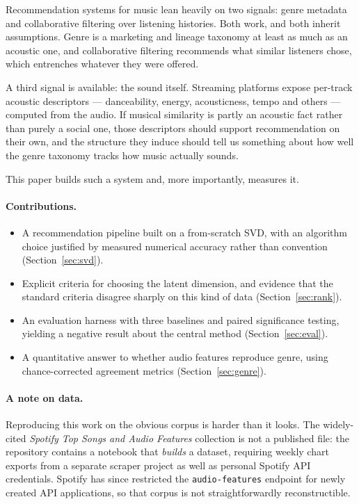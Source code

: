 \documentclass[11pt]{article}
\newcommand{\code}[1]{\texttt{\small #1}}
\begin{document}
Recommendation systems for music lean heavily on two signals: genre metadata
and collaborative filtering over listening histories. Both work, and both
inherit assumptions. Genre is a marketing and lineage taxonomy at least as much
as an acoustic one, and collaborative filtering recommends what similar
listeners chose, which entrenches whatever they were offered.

A third signal is available: the sound itself. Streaming platforms expose
per-track acoustic descriptors --- danceability, energy, acousticness, tempo
and others --- computed from the audio. If musical similarity is partly an
acoustic fact rather than purely a social one, those descriptors should support
recommendation on their own, and the structure they induce should tell us
something about how well the genre taxonomy tracks how music actually sounds.

This paper builds such a system and, more importantly, measures it.

\paragraph{Contributions.}
\begin{itemize}
  \item A recommendation pipeline built on a from-scratch SVD, with an
        algorithm choice justified by measured numerical accuracy rather than
        convention (Section~\ref{sec:svd}).
  \item Explicit criteria for choosing the latent dimension, and evidence that
        the standard criteria disagree sharply on this kind of data
        (Section~\ref{sec:rank}).
  \item An evaluation harness with three baselines and paired significance
        testing, yielding a negative result about the central method
        (Section~\ref{sec:eval}).
  \item A quantitative answer to whether audio features reproduce genre, using
        chance-corrected agreement metrics (Section~\ref{sec:genre}).
\end{itemize}

\paragraph{A note on data.} \label{par:data}
Reproducing this work on the obvious corpus is harder than it looks. The
widely-cited \emph{Spotify Top Songs and Audio Features} collection
\cite{orlandi} is not a published file: the repository contains a notebook that
\emph{builds} a dataset, requiring weekly chart exports from a separate
scraper project as well as personal Spotify API credentials. Spotify has since
restricted the \code{audio-features} endpoint for newly created API
applications, so that corpus is not straightforwardly reconstructible.
\end{document}
